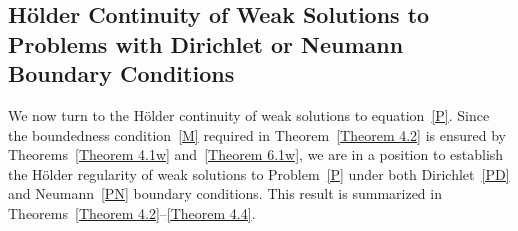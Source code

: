 \documentclass[10pt,reqno]{amsart}
\newcommand *\w{^\wedge}
\theoremstyle{definition}
\numberwithin{equation}{section}
\begin{document}


\subsection{Hölder Continuity of Weak Solutions to Problems with Dirichlet or Neumann Boundary Conditions}
We now turn to the Hölder continuity of weak solutions to equation~\eqref{P}. Since the boundedness condition~\eqref{M} required in Theorem~\ref{Theorem 4.2} is ensured by Theorems~\ref{Theorem 4.1w} and~\ref{Theorem 6.1w}, we are in a position to establish the Hölder regularity of weak solutions to Problem~\eqref{P} under both Dirichlet~\eqref{PD} and Neumann~\eqref{PN} boundary conditions. This result is summarized in Theorems~\ref{Theorem 4.2}–\ref{Theorem 4.4}.
\end{document}
